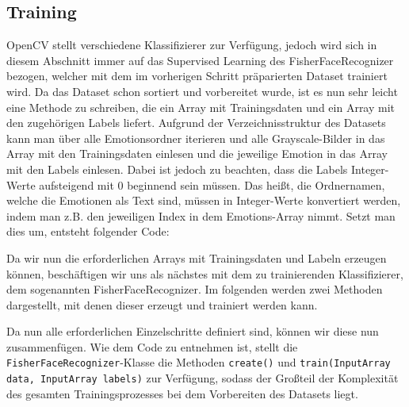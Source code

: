 \documentclass[12pt, a4paper]{scrbook}
\begin{document}
\subsection{Training}
OpenCV stellt verschiedene Klassifizierer zur Verfügung, jedoch wird sich in diesem Abschnitt immer auf das Supervised Learning des FisherFaceRecognizer bezogen, welcher mit dem im vorherigen Schritt präparierten Dataset trainiert wird. Da das Dataset schon sortiert und vorbereitet wurde, ist es nun sehr leicht eine Methode zu schreiben, die ein Array mit Trainingsdaten und ein Array mit den zugehörigen Labels liefert. Aufgrund der Verzeichnisstruktur des Datasets kann man über alle Emotionsordner iterieren und alle Grayscale-Bilder in das Array mit den Trainingsdaten einlesen und die jeweilige Emotion in das Array mit den Labels einlesen. Dabei ist jedoch zu beachten, dass die Labels Integer-Werte aufsteigend mit 0 beginnend sein müssen. Das heißt, die Ordnernamen, welche die Emotionen als Text sind, müssen in Integer-Werte konvertiert werden, indem man z.B. den jeweiligen Index in dem Emotions-Array  nimmt. Setzt man dies um, entsteht folgender Code:

Da wir nun die erforderlichen Arrays mit Trainingsdaten und Labeln erzeugen können, beschäftigen wir uns als nächstes mit dem zu trainierenden Klassifizierer, dem sogenannten FisherFaceRecognizer. Im folgenden werden zwei Methoden dargestellt, mit denen dieser erzeugt und trainiert werden kann.

Da nun alle erforderlichen Einzelschritte definiert sind, können wir diese nun zusammenfügen. 
Wie dem Code zu entnehmen ist, stellt die \texttt{FisherFaceRecognizer}-Klasse die Methoden \texttt{create()} und \texttt{train(InputArray data, InputArray labels)} zur Verfügung, sodass der Großteil der Komplexität des gesamten Trainingsprozesses bei dem Vorbereiten des Datasets liegt.
\end{document}
